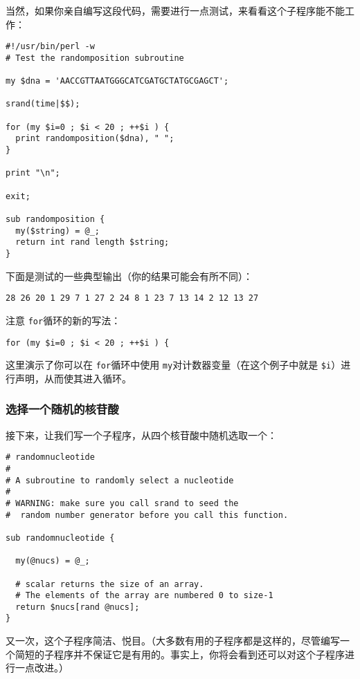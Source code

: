 当然，如果你亲自编写这段代码，需要进行一点测试，来看看这个子程序能不能工作：

\begin{lstlisting}
#!/usr/bin/perl -w
# Test the randomposition subroutine

my $dna = 'AACCGTTAATGGGCATCGATGCTATGCGAGCT';

srand(time|$$);

for (my $i=0 ; $i < 20 ; ++$i ) {
  print randomposition($dna), " ";
}

print "\n";

exit;

sub randomposition {
  my($string) = @_;
  return int rand length $string;
}
\end{lstlisting}

下面是测试的一些典型输出（你的结果可能会有所不同）：

\begin{lstlisting}
28 26 20 1 29 7 1 27 2 24 8 1 23 7 13 14 2 12 13 27 
\end{lstlisting}

注意 \verb|for|循环的新的写法：

\begin{lstlisting}
for (my $i=0 ; $i < 20 ; ++$i ) {
\end{lstlisting}

这里演示了你可以在 \verb|for|循环中使用 \verb|my|对计数器变量（在这个例子中就是 \verb|$i|）进行声明，从而使其进入循环。

\subsubsection{选择一个随机的核苷酸}
接下来，让我们写一个子程序，从四个核苷酸中随机选取一个：

\begin{lstlisting}
# randomnucleotide
#
# A subroutine to randomly select a nucleotide
#
# WARNING: make sure you call srand to seed the
#  random number generator before you call this function.

sub randomnucleotide {

  my(@nucs) = @_;

  # scalar returns the size of an array. 
  # The elements of the array are numbered 0 to size-1
  return $nucs[rand @nucs];
}
\end{lstlisting}

又一次，这个子程序简洁、悦目。（大多数有用的子程序都是这样的，尽管编写一个简短的子程序并不保证它是有用的。事实上，你将会看到还可以对这个子程序进行一点改进。）

